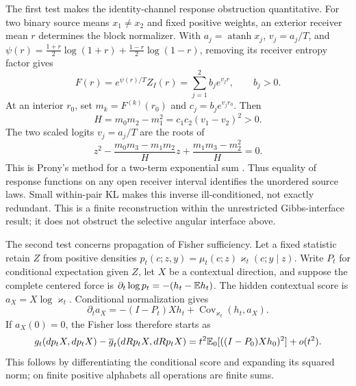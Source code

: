 The first test makes the identity-channel response obstruction quantitative. For two binary source means $x_1\ne x_2$ and fixed positive weights, an exterior receiver mean $r$ determines the block normalizer. With
$a_j=\operatorname{atanh}x_j$, $v_j=a_j/T$, and
$\psi(r)=\frac{1+r}{2}\log(1+r)+\frac{1-r}{2}\log(1-r)$, removing its receiver entropy factor gives
\begin{equation}
F(r)=e^{\psi(r)/T}Z_I(r)=\sum_{j=1}^2 b_je^{v_jr},
\qquad b_j>0.
\end{equation}
At an interior $r_0$, set $m_k=F^{(k)}(r_0)$ and $c_j=b_je^{v_jr_0}$. Then
\begin{equation}
H=m_0m_2-m_1^2=c_1c_2(v_1-v_2)^2>0.
\end{equation}
The two scaled logits $v_j=a_j/T$ are the roots of
\begin{equation}
z^2-\frac{m_0m_3-m_1m_2}{H}z
+\frac{m_1m_3-m_2^2}{H}=0.
\end{equation}
This is Prony's method for a two-term exponential sum \citep{Prony1795}. Thus equality of response functions on any open receiver interval identifies the unordered source laws. Small within-pair KL makes this inverse ill-conditioned, not exactly redundant. This is a finite reconstruction within the unrestricted Gibbs-interface result; it does not obstruct the selective angular interface above.

The second test concerns propagation of Fisher sufficiency. Let a fixed statistic retain $Z$ from positive densities
$p_t(c;z,y)=\mu_t(c;z)\varkappa_t(c;y\mid z)$.
Write $P_t$ for conditional expectation given $Z$, let $X$ be a contextual direction, and suppose the complete centered force is
$\partial_t\log p_t=-(h_t-\mathbb E h_t)$.
The hidden contextual score is $a_X=X\log\varkappa_t$. Conditional normalization gives
\begin{equation}
\partial_ta_X=-(I-P_t)Xh_t+
\operatorname{Cov}_{\varkappa_t}(h_t,a_X).
\end{equation}
If $a_X(0)=0$, the Fisher loss therefore starts as
\begin{equation}
g_t(dp_tX,dp_tX)-\overline g_t(dRp_tX,dRp_tX)
=t^2\mathbb E_0[((I-P_0)Xh_0)^2]+o(t^2).
\label{open:generated-loss}
\end{equation}
This follows by differentiating the conditional score and expanding its squared norm; on finite positive alphabets all operations are finite sums.

